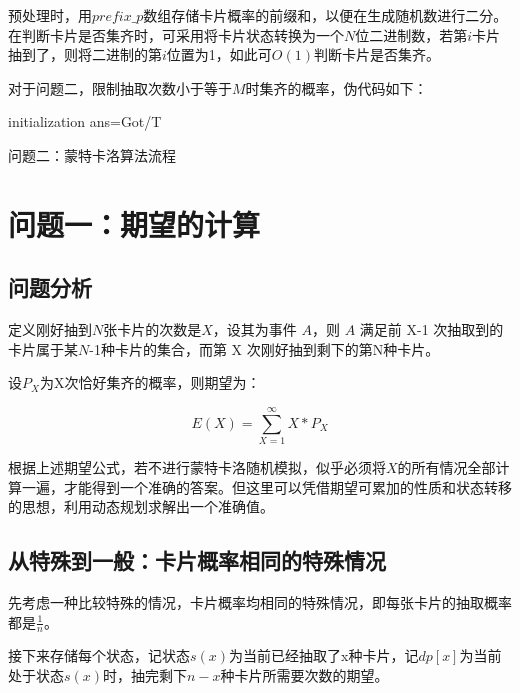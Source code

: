 \documentclass[master]{thesis-uestc}
\begin{document}
预处理时，用$prefix\_p$数组存储卡片概率的前缀和，以便在生成随机数进行二分。在判断卡片是否集齐时，可采用将卡片状态转换为一个$N$位二进制数，若第$i$卡片抽到了，则将二进制的第$i$位置为1，如此可$O(1)$判断卡片是否集齐。

对于问题二，限制抽取次数小于等于$M$时集齐的概率，伪代码如下：


\begin{algorithm}[H]
     initialization\;
     ans=Got/T\;
     \caption{问题二：蒙特卡洛算法流程}
    \end{algorithm}

\chapter{问题一：期望的计算}

\section{问题分析}

定义刚好抽到$N$张卡片的次数是$X$，设其为事件 $A$，则 $A$ 满足前 X-1 次抽取到的卡片属于某$N$-1种卡片的集合，而第 X 次刚好抽到剩下的第N种卡片。

设$P_X$为X次恰好集齐的概率，则期望为：

$$
E(X)=\sum\limits_{X=1}^{\infty}X*P_X 
$$

根据上述期望公式，若不进行蒙特卡洛随机模拟，似乎必须将$X
$的所有情况全部计算一遍，才能得到一个准确的答案。但这里可以凭借期望可累加的性质和状态转移的思想，利用动态规划求解出一个准确值。

\section{从特殊到一般：卡片概率相同的特殊情况}

先考虑一种比较特殊的情况，卡片概率均相同的特殊情况，即每张卡片的抽取概率都是$\frac{1}{n}$。

接下来存储每个状态，记状态$s(x)$为当前已经抽取了x种卡片，记$dp[x]$为当前处于状态$s(x)$时，抽完剩下$n-x$种卡片所需要次数的期望。
\end{document}
